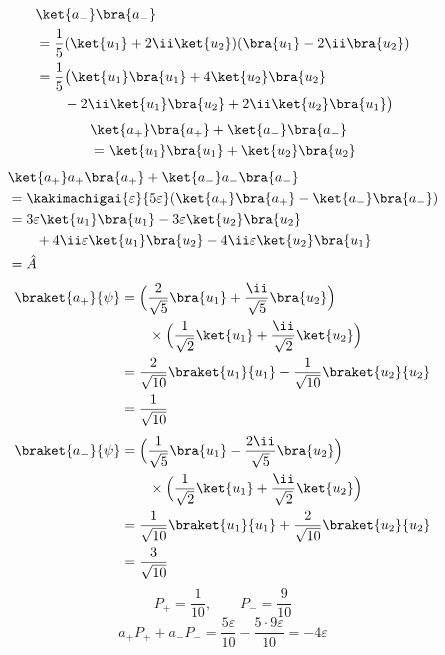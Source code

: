 \begin{align*}
&\ket{a_{-}}\bra{a_{-}}\\
&=\frac{1}{5}(\ket{u_{1}}+2\ii\ket{u_{2}})(\bra{u_{1}}-2\ii\bra{u_{2}})\\
&=\frac{1}{5}\bigl(\ket{u_{1}}\bra{u_{1}}+4\ket{u_{2}}\bra{u_{2}}\\
&\qquad-2\ii\ket{u_{1}}\bra{u_{2}}+2\ii\ket{u_{2}}\bra{u_{1}}\bigr)
\end{align*}
\begin{align*}
&\ket{a_{+}}\bra{a_{+}}+\ket{a_{-}}\bra{a_{-}}\\
&=\ket{u_{1}}\bra{u_{1}}+\ket{u_{2}}\bra{u_{2}}
\end{align*}
\begin{align*}
&\ket{a_{+}}a_{+}\bra{a_{+}}+\ket{a_{-}}a_{-}\bra{a_{-}}\\
&=\kakimachigai{\varepsilon}{5\varepsilon}(\ket{a_{+}}\bra{a_{+}}-\ket{a_{-}}\bra{a_{-}})\\
&=3\varepsilon\ket{u_{1}}\bra{u_{1}}-3\varepsilon\ket{u_{2}}\bra{u_{2}}\\
&\qquad+4\ii\varepsilon\ket{u_{1}}\bra{u_{2}}-4\ii\varepsilon\ket{u_{2}}\bra{u_{1}}\\
&=\hat{A}
\end{align*}
\begin{align*}
\braket{a_{+}}{\psi}&=\Bigl(\frac{2}{\sqrt{5}}\bra{u_{1}}+\frac{\ii}{\sqrt{5}}\bra{u_{2}}\Bigr)\\
&\qquad\times\Bigl(\frac{1}{\sqrt{2}}\ket{u_{1}}+\frac{\ii}{\sqrt{2}}\ket{u_{2}}\Bigr)\\
&=\frac{2}{\sqrt{10}}\braket{u_{1}}{u_{1}}-\frac{1}{\sqrt{10}}\braket{u_{2}}{u_{2}}\\
&=\frac{1}{\sqrt{10}}
\end{align*}
\begin{align*}
\braket{a_{-}}{\psi}&=\Bigl(\frac{1}{\sqrt{5}}\bra{u_{1}}-\frac{2\ii}{\sqrt{5}}\bra{u_{2}}\Bigr)\\
&\qquad\times\Bigl(\frac{1}{\sqrt{2}}\ket{u_{1}}+\frac{\ii}{\sqrt{2}}\ket{u_{2}}\Bigr)\\
&=\frac{1}{\sqrt{10}}\braket{u_{1}}{u_{1}}+\frac{2}{\sqrt{10}}\braket{u_{2}}{u_{2}}\\
&=\frac{3}{\sqrt{10}}
\end{align*}
\[ P_{+}=\frac{1}{10},\qquad P_{-}=\frac{9}{10} \]
\[ a_{+}P_{+}+a_{-}P_{-}=\frac{5\varepsilon}{10}-\frac{5\cdot9\varepsilon}{10}=-4\varepsilon \]
